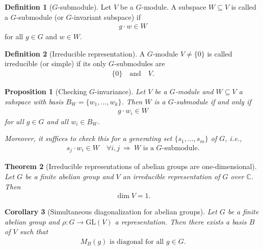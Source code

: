 \documentclass[titlepage]{article}
\theoremstyle{plain}
\newtheorem{theorem}{Theorem}[section]
\newtheorem{proposition}[theorem]{Proposition}
\newtheorem{corollary}[theorem]{Corollary}
\theoremstyle{definition}
\newtheorem{definition}{Definition}[section]
\theoremstyle{remark}
\theoremstyle{exercise-style}
\numberwithin{equation}{section}
\numberwithin{theorem}{section}
\numberwithin{remark}{section}
\begin{document}

\begin{definition}[$G$-submodule]
Let $V$ be a $G$-module. A subspace $W \subseteq V$ is called a $G$-submodule (or $G$-invariant subspace) if
\begin{align}
g \cdot w \in W
\end{align}
for all $g \in G$ and $w \in W$.
\end{definition}

\begin{definition}[Irreducible representation]
A $G$-module $V \neq \{0\}$ is called irreducible (or simple) if its only $G$-submodules are
\begin{align}
\{0\} \quad \text{and} \quad V.
\end{align}
\end{definition}

\begin{proposition}[Checking $G$-invariance]
Let $V$ be a $G$-module and $W \subseteq V$ a subspace with basis $B_W = \{w_1,\dots,w_k\}$. Then $W$ is a $G$-submodule if and only if
\begin{align}
g \cdot w_i \in W
\end{align}
for all $g \in G$ and all $w_i \in B_W$.

Moreover, it suffices to check this for a generating set $\{s_1,\dots,s_m\}$ of $G$, i.e.,
\begin{align}
s_j \cdot w_i \in W \quad \forall i,j \ \Longrightarrow \ W \text{ is a $G$-submodule}.
\end{align}
\end{proposition}

\begin{theorem}[Irreducible representations of abelian groups are one-dimensional]
Let $G$ be a finite abelian group and $V$ an irreducible representation of $G$ over $\mathbb{C}$. Then
\begin{align}
\dim V = 1.
\end{align}
\end{theorem}

\begin{corollary}[Simultaneous diagonalization for abelian groups]
Let $G$ be a finite abelian group and $\rho: G \to \mathrm{GL}(V)$ a representation. Then there exists a basis $B$ of $V$ such that
\begin{align}
M_B(g) \text{ is diagonal for all } g \in G.
\end{align}
\end{corollary}
\end{document}
